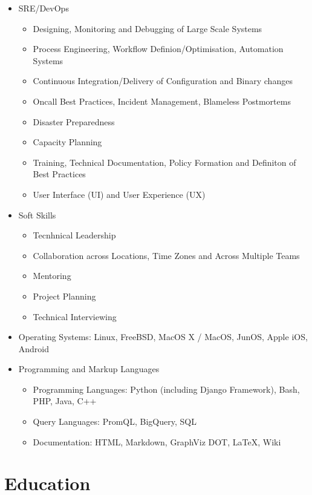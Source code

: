 \documentclass[a4paper, 10pt] {article}
\begin{document}
\begin{itemize}[itemsep=2pt,parsep=2pt]
\item SRE/DevOps
  \begin{itemize}[itemsep=2pt,parsep=2pt]
  \item Designing, Monitoring and Debugging of Large Scale Systems
  \item Process Engineering, Workflow Definion/Optimisation, Automation Systems
  \item Continuous Integration/Delivery of Configuration and Binary changes
  \item Oncall Best Practices, Incident Management, Blameless Postmortems
  \item Disaster Preparedness
  \item Capacity Planning
  \item Training, Technical Documentation, Policy Formation and Definiton of Best Practices
  \item User Interface (UI) and User Experience (UX)
  \end{itemize}
\item Soft Skills
  \begin{itemize}[itemsep=2pt,parsep=2pt]
  \item Tecnhnical Leadership
  \item Collaboration across Locations, Time Zones and Across Multiple Teams
  \item Mentoring
  \item Project Planning
  \item Technical Interviewing
  \end{itemize}
  \item Operating Systems: Linux, FreeBSD, MacOS X / MacOS, JunOS, Apple iOS, Android
\item Programming and Markup Languages
  \begin{itemize}[itemsep=2pt,parsep=2pt]
  \item Programming Languages: Python (including Django Framework), Bash, PHP, Java, C++
  \item Query Languages: PromQL, BigQuery, SQL
  \item Documentation: HTML, Markdown, GraphViz DOT, \LaTeX, Wiki
  \end{itemize}
\end{itemize}  

\section*{Education}
\end{document}
